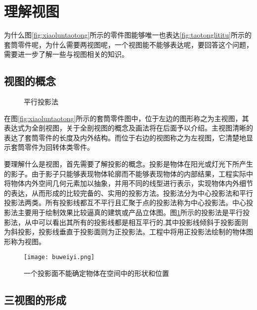 \section{理解视图}
为什么图\ref{fig:xiaoluntaotong}所示的零件图能够唯一也表达\ref{fig:taotonglititu}所示的套筒零件呢，为什么需要两视图呢，一个视图能不能够表达呢，要回答这个问题，需要进一步了解一些与视图相关的知识。
\subsection{视图的概念}
\begin{figure}[htbp]
\centering
{}\hspace{30pt}
\caption{平行投影法}\label{pingxingtouyin}
\end{figure}

 在图\ref{fig:xiaoluntaotong}所示的套筒零件图中，位于左边的图形称之为主视图，其表达式为全剖视图，关于全剖视图的概念及画法将在后面予以介绍。主视图清晰的表达了套筒零件的长度及内外结构。而位于右边的视图称之为左视图，它清楚地显示套筒零件为回转体类零件。

要理解什么是视图，首先需要了解投影的概念。投影是物体在阳光或灯光下所产生的影子。由于影子只能够表现物体轮廓而不能够表现物体的内部结果，工程实际中将物体内外空间几何元素加以抽象，并用不同的线型进行表示，实现物体内外细节的表达，从而形成的比较完备的、实用的投影方法。投影法分为中心投影法和平行投影法两类。所有投影线都互不平行且汇聚于点的投影法称为中心投影法。中心投影法主要用于绘制效果比较逼真的建筑或产品立体图。图\ref{pingxingtouyin}所示的投影法是平行投影法，从中可以看出其所有的投影线都是相互平行的,其中投影线倾斜于投影面则为斜投影，投影线垂直于投影面则为正投影法。工程中将用正投影法绘制的物体图形称为视图。
\begin{figure}[htbp]
\centering
\texttt{[image: buweiyi.png]}
\caption{一个投影面不能确定物体在空间中的形状和位置}\label{fig:singleprojection}
\end{figure}
\subsection{三视图的形成}

